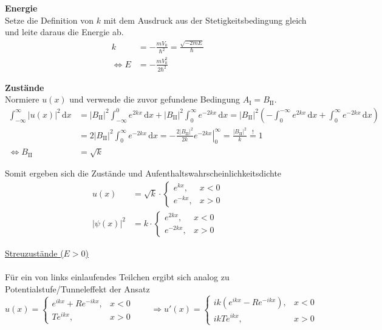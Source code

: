 \documentclass{article}
\newcommand{\diff}{\mathrm{d}}
\newcommand{\lr}[1]{\left(#1\right)}
\begin{document}
{\textbf{Energie}\\
Setze die Definition von $k$ mit dem Ausdruck aus der Stetigkeitsbedingung gleich und leite daraus die Energie ab.
	\begin{align*}
		k &= -\frac{mV_0}{\hbar^2} = \frac{\sqrt{-2mE}}{\hbar} \\		
		\Leftrightarrow E &= -\frac{m V_0^2}{2\hbar^2}
	\end{align*}

\textbf{Zustände}\\
Normiere $u(x)$ und verwende die zuvor gefundene Bedingung $A_\text{I} = B_\text{II}$.
	\begin{align*}
		\int_{-\infty}^\infty |u(x)|^2 \,\diff x &= |B_\text{II}|^2 \int_{-\infty}^0 e^{2kx} \,\diff x + |B_\text{II}|^2 \int_0^\infty e^{-2kx} \,\diff x = |B_\text{II}|^2 \lr{-\int_0^{-\infty} e^{2kx} \,\diff x + \int_0^\infty e^{-2kx} \,\diff x} \\
		&= 2|B_\text{II}|^2 \int_0^\infty e^{-2kx} \,\diff x = -\frac{2|B_\text{II}|^2}{2k} \left.e^{-2kx}\right|_0^\infty = \frac{|B_\text{II}|^2}{k} \stackrel{!}{=} 1 \\
		\Leftrightarrow B_\text{II} &= \sqrt{k}
	\end{align*}

Somit ergeben sich die Zustände und Aufenthaltswahrscheinlichkeitsdichte
	\begin{align*}
		u(x) &= \sqrt{k} \cdot
		\begin{cases}
			e^{kx}, & x<0 \\
			e^{-kx}, & x>0
		\end{cases} \\
		|\psi(x)|^2 &= k \cdot
		\begin{cases}
			e^{2kx}, & x<0 \\
			e^{-2kx}, & x>0
		\end{cases}
	\end{align*}


\underline{Streuzustände ($E>0$)}\\
\\
Für ein von links einlaufendes Teilchen ergibt sich analog zu Potentialstufe/Tunneleffekt der Ansatz
	$$u(x) =
	\begin{cases}
		e^{ikx} + Re^{-ikx}, & x<0 \\
		Te^{ikx}, & x>0		
	\end{cases}
	\qquad\Rightarrow
	u'(x) =
	\begin{cases}
		ik(e^{ikx} - Re^{-ikx}), & x<0 \\
		ikTe^{ikx}, & x>0		
	\end{cases}$$
	
}
\end{document}

